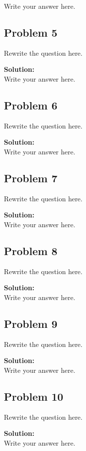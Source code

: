 \documentclass[letterpaper, 11pt, reqno]{amsart}
\begin{document}
%
Write your answer here.

\subsection*{Problem 5}

%
Rewrite the question here.

\vspace{0.1cm}
\noindent
\textbf{Solution:} \\

%
Write your answer here.

\subsection*{Problem 6}

%
Rewrite the question here.

\vspace{0.1cm}
\noindent
\textbf{Solution:} \\

%
Write your answer here.

\subsection*{Problem 7}

%
Rewrite the question here.

\vspace{0.1cm}
\noindent
\textbf{Solution:} \\

%
Write your answer here.

\subsection*{Problem 8}

%
Rewrite the question here.

\vspace{0.1cm}
\noindent
\textbf{Solution:} \\

%
Write your answer here.

\subsection*{Problem 9}

%
Rewrite the question here.

\vspace{0.1cm}
\noindent
\textbf{Solution:} \\

%
Write your answer here.

\subsection*{Problem 10}

%
Rewrite the question here.

\vspace{0.1cm}
\noindent
\textbf{Solution:} \\

%
Write your answer here.
\end{document}
